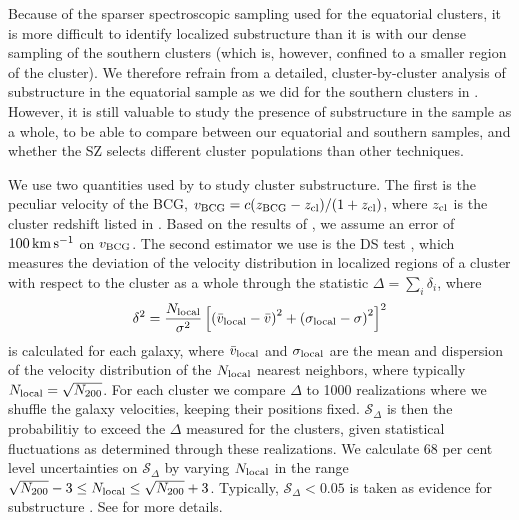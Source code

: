 Because of the sparser spectroscopic sampling used for the equatorial clusters, it is more 
difficult to identify localized substructure than it is with our dense sampling of the southern 
clusters (which is, however, confined to a smaller region of the cluster). We therefore refrain 
from a detailed, cluster-by-cluster analysis of substructure in the equatorial sample as we did 
for the southern clusters in \cite{sifon13}. However, it is still valuable to study the presence 
of substructure in the sample as a whole, to be able to compare between our equatorial and 
southern samples, and whether the SZ selects different cluster populations than other techniques.

We use two quantities used by \cite{sifon13} to study cluster substructure. The first is the 
peculiar velocity of the BCG, $v_{\rm BCG}=c(z_{\rm BCG}-z_{\rm cl})/(1+z_{\rm cl})$, where $z_{\rm cl}$ 
is the cluster redshift listed in . Based on the results of 
, we assume an error of $100\,\mathrm{km\,s^{-1}}$ on $v_{\rm BCG}$. The 
second estimator we use is the DS test \citep{dressler88}, which measures the deviation of the 
velocity distribution in localized regions of a cluster with respect to the cluster as a whole 
through the statistic $\Delta=\sum_i\delta_i$, where
\begin{equation}\label{eq:delta}
\delta^2 = \frac{N_{\rm local}}{\sigma^2}\left[\left(\bar v_{\rm local} - \bar v\right)^2 + 
\left(\sigma_{\rm local} - \sigma\right)^2\right]^2
\end{equation}
is calculated for each galaxy, where $\bar v_{\rm local}$ and $\sigma_{\rm local}$ are the mean 
and dispersion of the velocity distribution of the $N_{\rm local}$ nearest neighbors, where 
typically $N_{\rm local}=\sqrt{N_{200}}$. For each cluster we compare $\Delta$ to 1000 
realizations where we shuffle the galaxy velocities, keeping their positions fixed. $\mathcal{S}_\Delta$ is 
then the probabilitiy to exceed the $\Delta$ measured for the clusters, given statistical 
fluctuations as determined through these realizations. We calculate 68 per cent level 
uncertainties on $\mathcal{S}_\Delta$ by varying $N_{\rm local}$ in the range $\sqrt{N_{200}}-3 \leq N_{\rm 
local} \leq \sqrt{N_{200}}+3$. Typically, $\mathcal{S}_\Delta<0.05$ is taken as evidence for substructure 
\citep{pinkney96}. See \cite{sifon13} for more details.


